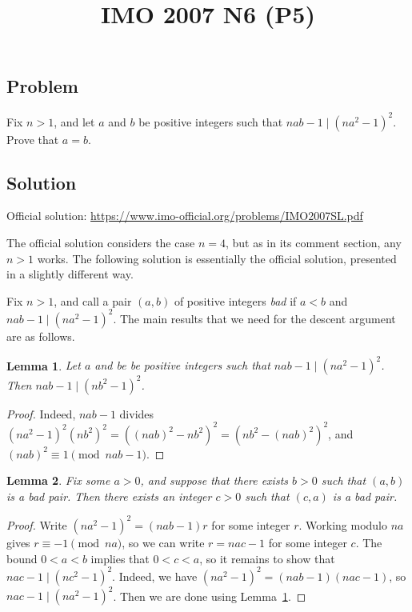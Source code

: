 \documentclass{article}
\title{IMO 2007 N6 (P5)}
\author{}
\date{}
\newtheorem{lemma}{Lemma}
\begin{document}
\maketitle



\subsection*{Problem}

Fix $n > 1$, and let $a$ and $b$ be positive integers such that $nab - 1 \mid (na^2 - 1)^2$.
Prove that $a = b$.



\subsection*{Solution}

Official solution: \url{https://www.imo-official.org/problems/IMO2007SL.pdf}

The official solution considers the case $n = 4$, but as in its comment section, any $n > 1$ works.
The following solution is essentially the official solution, presented in a slightly different way.

Fix $n > 1$, and call a pair $(a, b)$ of positive integers \emph{bad} if $a < b$ and $nab - 1 \mid (na^2 - 1)^2$.
The main results that we need for the descent argument are as follows.

\begin{lemma}\label{2007n6-1}
Let $a$ and be be positive integers such that $nab - 1 \mid (na^2 - 1)^2$.
Then $nab - 1 \mid (nb^2 - 1)^2$.
\end{lemma}
\begin{proof}
Indeed, $nab - 1$ divides $(na^2 - 1)^2 (nb^2)^2 = ((nab)^2 - nb^2)^2 = (nb^2 - (nab)^2)^2$, and $(nab)^2 \equiv 1 \pmod{nab - 1}$.
\end{proof}

\begin{lemma}\label{2007n6-2}
Fix some $a > 0$, and suppose that there exists $b > 0$ such that $(a, b)$ is a bad pair.
Then there exists an integer $c > 0$ such that $(c, a)$ is a bad pair.
\end{lemma}
\begin{proof}
Write $(na^2 - 1)^2 = (nab - 1) r$ for some integer $r$.
Working modulo $na$ gives $r \equiv -1 \pmod{na}$, so we can write $r = nac - 1$ for some integer $c$.
The bound $0 < a < b$ implies that $0 < c < a$, so it remains to show that $nac - 1 \mid (nc^2 - 1)^2$.
Indeed, we have $(na^2 - 1)^2 = (nab - 1)(nac - 1)$, so $nac - 1 \mid (na^2 - 1)^2$.
Then we are done using Lemma~\ref{2007n6-1}.
\end{proof}
\end{document}
